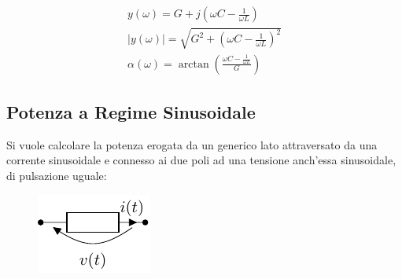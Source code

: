 \documentclass{article}
\numberwithin{equation}{subsection}
\begin{document}
\begin{gather}
    y(\omega)=G+j\displaystyle\left(\omega C-\frac{1}{\omega L}\right)\\
    |y(\omega)|=\displaystyle\sqrt{G^2+\left(\omega C-\frac{1}{\omega L}\right)^2}\\
    \alpha(\omega)=\arctan\left(\displaystyle\frac{\displaystyle\omega C-\frac{1}{\omega L}}{G}\right)
\end{gather}

\subsection{Potenza a Regime Sinusoidale}

Si vuole calcolare la potenza erogata da un generico lato attraversato da una corrente sinusoidale e connesso ai due poli ad una tensione anch'essa sinusoidale, di pulsazione 
uguale:
\begin{figure}[H]%
    \centering
    \includegraphics{generico-fasori.pdf}%
    \label{fig:generico-fasori}
\end{figure}
\end{document}
